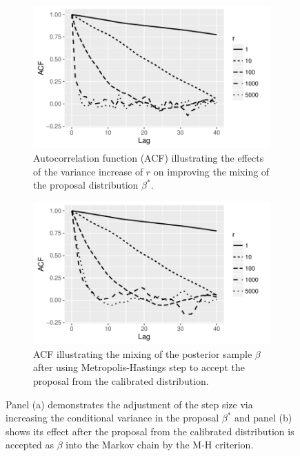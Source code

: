 \documentclass[10pt]{article}
\begin{document}
\begin{figure}[H]
  \begin{subfigure}[b]{0.49\textwidth}
 \includegraphics[width=1\textwidth]{probit_demo_acf_prop.pdf}
  \caption{Autocorrelation function (ACF) illustrating the effects of the variance increase of $r$ on improving the mixing of the proposal distribution $\beta^*$.}
 \label{probit_demo_intercept_proposal}
\end{subfigure}
  \hfill
   \begin{subfigure}[b]{0.49\textwidth}
 \includegraphics[width=1\textwidth]{probit_demo_acf.pdf}
  \caption{ACF illustrating the mixing of the posterior sample $\beta$ after using Metropolis-Hastings step to accept the proposal from the calibrated distribution.}
   \label{probit_demo_intercept_posteriorsample}
\end{subfigure}
 \caption{Panel (a) demonstrates the adjustment of the step size via increasing the conditional variance in the proposal $\beta^*$ and panel (b) shows its effect after the proposal from the calibrated distribution is accepted as $\beta$ into the Markov chain by the M-H criterion.}
 \label{probit_demo_intercept}
 \end{figure}
\end{document}
